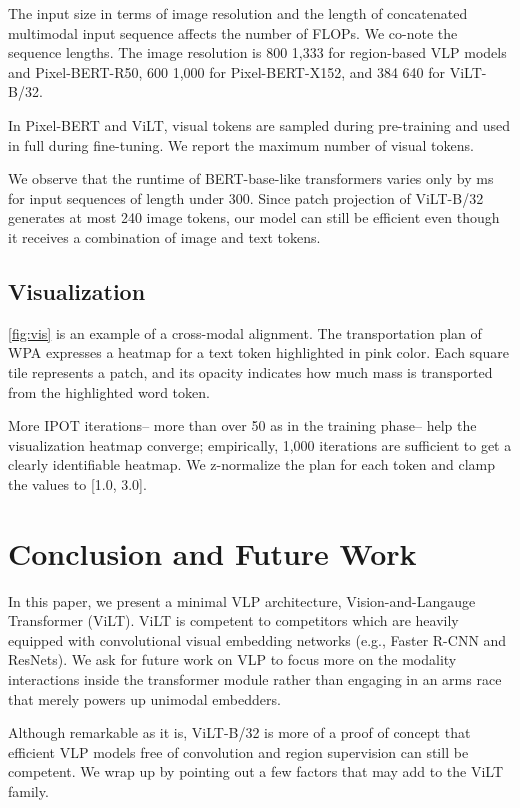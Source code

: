 \documentclass{article}
\begin{document}
The input size in terms of image resolution and the length of concatenated multimodal input sequence affects the number of FLOPs. We co-note the sequence lengths.
The image resolution is 800  1,333 for region-based VLP models and Pixel-BERT-R50, 600  1,000 for Pixel-BERT-X152, and 384  640 for ViLT-B/32.

In Pixel-BERT and ViLT, visual tokens are sampled during pre-training and used in full during fine-tuning. We report the maximum number of visual tokens. 

We observe that the runtime of BERT-base-like transformers varies only by  ms for input sequences of length under 300. Since patch projection of ViLT-B/32 generates at most 240 image tokens, our model can still be efficient even though it receives a combination of image and text tokens.

\subsection{Visualization}

\cref{fig:vis} is an example of a cross-modal alignment.
The transportation plan of WPA expresses a heatmap for a text token highlighted in pink color. 
Each square tile represents a patch, and its opacity indicates how much mass is transported from the highlighted word token.

More IPOT iterations-- more than over 50 as in the training phase-- help the visualization heatmap converge; empirically, 1,000 iterations are sufficient to get a clearly identifiable heatmap.
We z-normalize the plan for each token and clamp the values to [1.0, 3.0].

\section{Conclusion and Future Work}
\label{sec:conclusion}
In this paper, we present a minimal VLP architecture, Vision-and-Langauge Transformer (ViLT).
ViLT is competent to competitors which are heavily equipped with convolutional visual embedding networks (e.g., Faster R-CNN and ResNets).
We ask for future work on VLP to focus more on the modality interactions inside the transformer module rather than engaging in an arms race that merely powers up unimodal embedders.

Although remarkable as it is, ViLT-B/32 is more of a proof of concept that efficient VLP models free of convolution and region supervision can still be competent.
We wrap up by pointing out a few factors that may add to the ViLT family.
\end{document}
